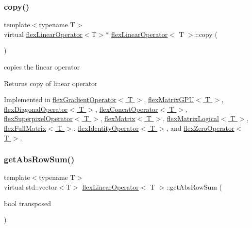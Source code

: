 \subsubsection{\texorpdfstring{copy()}{copy()}}
{\footnotesize\ttfamily template$<$typename T$>$ \\
virtual \hyperlink{classflex_linear_operator}{flex\+Linear\+Operator}$<$T$>$$\ast$ \hyperlink{classflex_linear_operator}{flex\+Linear\+Operator}$<$ T $>$\+::copy (\begin{DoxyParamCaption}{ }\end{DoxyParamCaption})\hspace{0.3cm}{\ttfamily [pure virtual]}}



copies the linear operator 

\begin{DoxyReturn}{Returns}
copy of linear operator 
\end{DoxyReturn}


Implemented in \hyperlink{classflex_gradient_operator_a4b1480051ac7763da809c509685316d2}{flex\+Gradient\+Operator$<$ T $>$}, \hyperlink{classflex_matrix_g_p_u_a4df27ef284eec123ba72f1b5788f1180}{flex\+Matrix\+G\+P\+U$<$ T $>$}, \hyperlink{classflex_diagonal_operator_aeca7325de5eaface63363e9710034128}{flex\+Diagonal\+Operator$<$ T $>$}, \hyperlink{classflex_concat_operator_a8e554cb6edb47de0cf922cf51ec398b5}{flex\+Concat\+Operator$<$ T $>$}, \hyperlink{classflex_superpixel_operator_ab0e066735127a3b39958c6719fe03156}{flex\+Superpixel\+Operator$<$ T $>$}, \hyperlink{classflex_matrix_a4e9d53b8d606511759decbf52628203a}{flex\+Matrix$<$ T $>$}, \hyperlink{classflex_matrix_logical_a25c9ecc21cfccc07e1390c554784ee27}{flex\+Matrix\+Logical$<$ T $>$}, \hyperlink{classflex_full_matrix_a849d2974a11456c6a23801f51838bc7b}{flex\+Full\+Matrix$<$ T $>$}, \hyperlink{classflex_identity_operator_abbd34b97e3e014f02629a68a02f5c41b}{flex\+Identity\+Operator$<$ T $>$}, and \hyperlink{classflex_zero_operator_ab26ce548041980be572f7972907397af}{flex\+Zero\+Operator$<$ T $>$}.

\mbox{\label{classflex_linear_operator_ad6caa7b09e6e3c401cadef61b8e2307e}} 
\subsubsection{\texorpdfstring{get\+Abs\+Row\+Sum()}{getAbsRowSum()}}
{\footnotesize\ttfamily template$<$typename T$>$ \\
virtual std\+::vector$<$T$>$ \hyperlink{classflex_linear_operator}{flex\+Linear\+Operator}$<$ T $>$\+::get\+Abs\+Row\+Sum (\begin{DoxyParamCaption}\item[{bool}]{transposed }\end{DoxyParamCaption})\hspace{0.3cm}{\ttfamily [pure virtual]}}



